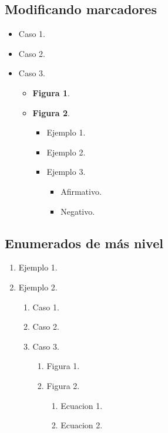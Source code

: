 \documentclass{article}
\begin{document}
\subsection{Modificando marcadores}
\begin{itemize} \renewcommand{\labelitemi}{\ding{51}}
    \item Caso 1. 
    \item Caso 2. 
    \item Caso 3.
    \begin{itemize} \renewcommand{\labelitemii}{\ding{60}}
        \item \textbf{Figura 1}.
        \item \textbf{Figura 2}.
            \begin{itemize} \renewcommand{\labelitemiii}{\ding{81}}
            \item Ejemplo 1. 
            \item Ejemplo 2. 
            \item Ejemplo 3. 
            \begin{itemize}
                \renewcommand{\labelitemiv}{\ding{248}} 
                \item Afirmativo.
                \item Negativo. 
            \end{itemize}
        \end{itemize} 
    \end{itemize}
\end{itemize}
\subsection{Enumerados de más nivel}
\begin{enumerate} 
    \item Ejemplo 1. 
    \item Ejemplo 2.
    \begin{enumerate} 
        \item Caso 1. 
        \item Caso 2. 
        \item Caso 3.
        \begin{enumerate} 
            \item Figura 1. 
            \item Figura 2.
            \begin{enumerate}[I] 
                \item Ecuacion 1. 
                \item Ecuacion 2. 
            \end{enumerate} 
        \end{enumerate}
    \end{enumerate} 
\end{enumerate}
\end{document}

